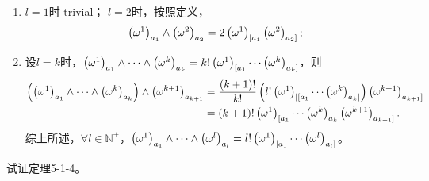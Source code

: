 \begin{xiti}
	\begin{zm}
		\begin{enumerate}
			\item $l=1$时 trivial； $l=2 $时，按照定义，\[ \tensor{\left(\omega^1\right)}{_{a_1}} \wedge \tensor{\left(\omega^2\right)}{_{a_2}} = 2 \tensor{\left(\omega^1\right)}{_{[a_1}} \tensor{\left(\omega^2\right)}{_{a_2 ]}}; \]
			\item 设$l=k$时，$\tensor{\left( \omega^1 \right)}{_{a_1}} \wedge \cdots \wedge \tensor{\left( \omega^k \right)}{_{a_k}} = k! \tensor{\left( \omega^1 \right)}{_{[a_1}} \cdots \tensor{\left( \omega^k \right)}{_{a_k]}} $，则
			\begin{align*}
			\left(\tensor{\left( \omega^1 \right)}{_{a_1}} \wedge \cdots \wedge \tensor{\left( \omega^k \right)}{_{a_k}}\right) \wedge \tensor{\left(\omega^{k+1}\right)}{_{a_{k+1}}} &= \frac{\left(k+1\right)!}{k!} \left(l! \tensor{\left( \omega^1 \right)}{_{[[a_1}} \cdots \tensor{\left( \omega^k \right)}{_{a_k]}}\right) \tensor{\left(\omega^{k+1}\right)}{_{a_{k+1}]}}\\
			&= \left(k+1\right)! \tensor{\left( \omega^1 \right)}{_{[a_1}} \cdots \tensor{\left( \omega^k \right)}{_{a_k}} \tensor{\left(\omega^{k+1}\right)}{_{a_{k+1}]}}.
			\end{align*}
			综上所述，$\forall l \in \mathbb{N}^+ $，$\tensor{\left( \omega^1 \right)}{_{a_1}} \wedge \cdots \wedge \tensor{\left( \omega^l \right)}{_{a_l}} = l! \tensor{\left( \omega^1 \right)}{_{[a_1}} \cdots \tensor{\left( \omega^l \right)}{_{a_l]}}$。
		\end{enumerate}
	\end{zm}
	
	\item 试证定理5-1-4。
	

\end{xiti}
